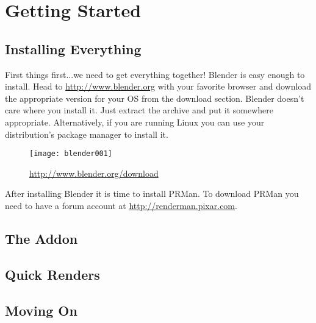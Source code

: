\chapter{Getting Started}
\section{Installing Everything}
First things first...we need to get everything together!
Blender is easy enough to install.  Head to \url{http://www.blender.org} with your favorite browser and download the appropriate version for your OS from the download section.  Blender doesn't care where you install it.  Just extract the archive and put it somewhere appropriate.  Alternatively, if you are running Linux you can use your distribution's package manager to install it.\begin{figure}\texttt{[image: blender001]}	\caption{\url{http://www.blender.org/download}}\end{figure}
After installing Blender it is time to install PRMan.  To download PRMan you need to have a forum account at \url{http://renderman.pixar.com}.
\section{The Addon}
\section{Quick Renders}
\section{Moving On}

